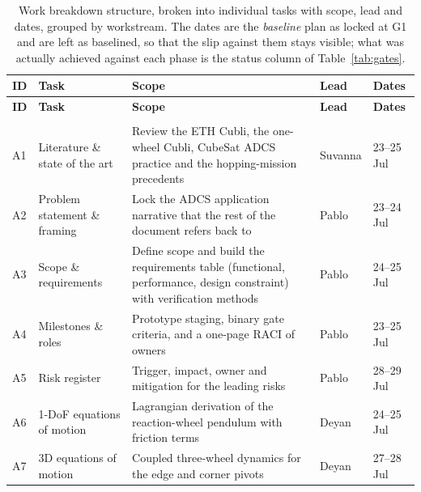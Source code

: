 %
%

{\small
\setlength{\tabcolsep}{4pt}%
\begin{longtable}{@{}L{0.9cm} L{3.1cm} L{6.4cm} L{1.9cm} L{2.0cm}@{}}
\caption[Work breakdown structure: detailed task list]{Work breakdown structure,
broken into individual tasks with scope, lead and dates, grouped by workstream.
The dates are the \emph{baseline} plan as locked at G1 and are left as
baselined, so that the slip against them stays visible; what was actually
achieved against each phase is the status column of
Table~\ref{tab:gates}.}
\label{tab:wbs_tasks}\\
\toprule
\textbf{ID} & \textbf{Task} & \textbf{Scope} & \textbf{Lead} & \textbf{Dates} \\
\midrule\endfirsthead
\toprule
\textbf{ID} & \textbf{Task} & \textbf{Scope} & \textbf{Lead} & \textbf{Dates} \\
\midrule\endhead
\bottomrule\endfoot
{} \\
\midrule
A1 & Literature \& state of the art & Review the ETH Cubli, the one-wheel Cubli, CubeSat ADCS practice and the hopping-mission precedents & Suvanna & 23--25 Jul \\
A2 & Problem statement \& framing & Lock the ADCS application narrative that the rest of the document refers back to & Pablo & 23--24 Jul \\
A3 & Scope \& requirements & Define scope and build the requirements table (functional, performance, design constraint) with verification methods & Pablo & 24--25 Jul \\
A4 & Milestones \& roles & Prototype staging, binary gate criteria, and a one-page RACI of owners & Pablo & 23--25 Jul \\
A5 & Risk register & Trigger, impact, owner and mitigation for the leading risks & Pablo & 28--29 Jul \\
A6 & 1-DoF equations of motion & Lagrangian derivation of the reaction-wheel pendulum with friction terms & Deyan & 24--25 Jul \\
A7 & 3D equations of motion & Coupled three-wheel dynamics for the edge and corner pivots & Deyan & 27--28 Jul \\

\end{longtable}}
